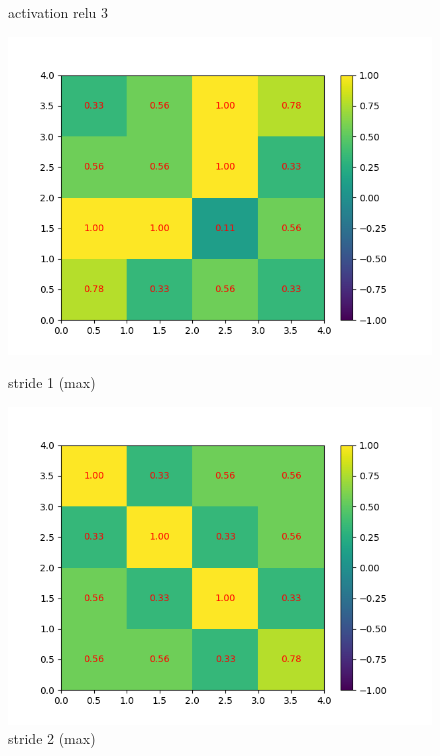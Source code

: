 \begin{figure}[h]
        \caption{activation relu 3}
    \endminipage
\end{figure}

\begin{figure}[h]
        \includegraphics[width=\textwidth]{img/cnn_exemple/cross/stride_1_max.png}
        \caption{stride 1 (max)}
    \endminipage\hfill
        \includegraphics[width=\textwidth]{img/cnn_exemple/cross/stride_2_max.png}
        \caption{stride 2 (max)}
    \endminipage\hfill

\end{figure}
